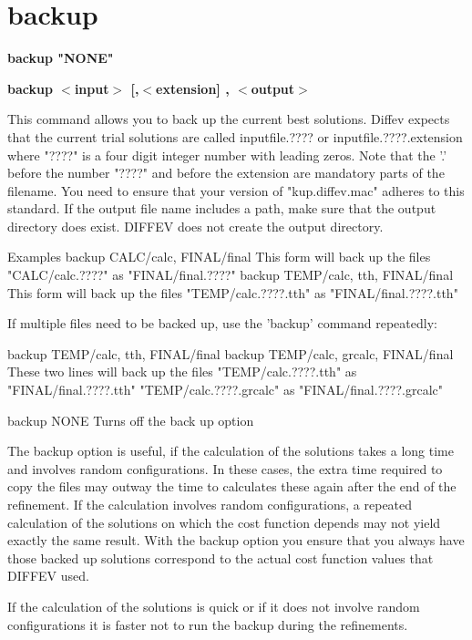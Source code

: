 \section{backup}
{\bf backup "NONE" \par }
{\bf backup $ <$input$> $ [,$ <$extension] , $ <$output$> $ \par }
\par
\vspace{3pt}
This command allows you to back up the current best solutions. 
Diffev expects that the current trial solutions are called 
inputfile.???? 
or 
inputfile.????.extension 
where "????" is a four digit integer number with leading zeros. 
Note that the '.' before the number "????" and before the extension 
are mandatory parts of the filename. You need to ensure that your 
version of "kup.diffev.mac" adheres to this standard. 
If the output file name includes a path, make sure that the output 
directory does exist. DIFFEV does not create the output directory. 
\par
\par
Examples 
backup CALC/calc, FINAL/final 
This form will back up the files 
      "CALC/calc.????" as "FINAL/final.????" 
backup TEMP/calc, tth, FINAL/final 
This form will back up the files 
      "TEMP/calc.????.tth" as "FINAL/final.????.tth" 
\par
If multiple files need to be backed up, use the 'backup' command 
repeatedly: 
\par
backup TEMP/calc, tth,    FINAL/final 
backup TEMP/calc, grcalc, FINAL/final 
These two lines will back up the files 
      "TEMP/calc.????.tth"    as "FINAL/final.????.tth" 
      "TEMP/calc.????.grcalc" as "FINAL/final.????.grcalc" 
\par
backup NONE 
  Turns off the back up option 
\par
The backup option is useful, if the calculation of the solutions 
takes a long time and involves random configurations. In these cases, 
the extra time required to copy the files may outway the time to 
calculates these again after the end of the refinement. 
If the calculation involves random configurations, a repeated 
calculation of the solutions on which the cost function depends 
may not yield exactly the same result. With the backup option you 
ensure that you always have those backed up solutions correspond 
to the actual cost function values that DIFFEV used. 
\par
If the calculation of the solutions is quick or if it does not 
involve random configurations it is faster not to run the backup 
during the refinements. 

